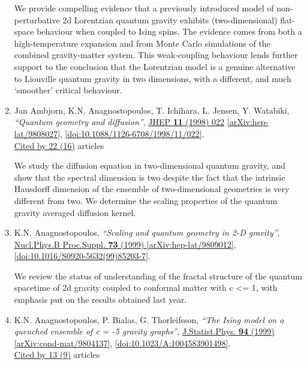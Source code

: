 \documentclass[a4paper,10pt]{article}
\begin{document}
\begin{enumerate}
We provide compelling evidence that a previously introduced model of non-perturbative 2d Lorentzian quantum gravity exhibits (two-dimensional) flat-space behaviour when coupled to Ising spins. The evidence comes from both a high-temperature expansion and from Monte Carlo simulations of the combined gravity-matter system. This weak-coupling behaviour lends further support to the conclusion that the Lorentzian model is a genuine alternative to Liouville quantum gravity in two dimensions, with a different, and much `smoother' critical behaviour.
\item Jan Ambjorn, K.N. Anagnostopoulos, T. Ichihara, L. Jensen, Y. Watabiki, {\it ``Quantum geometry and diffusion''}, \href{https://www.doi.org/10.1088/1126-6708/1998/11/022}{JHEP {\bf 11} (1998) 022} \href{https://arxiv.org/abs/hep-lat/9808027}{[arXiv:hep-lat/9808027]}, \href{https://www.doi.org/10.1088/1126-6708/1998/11/022}{[doi:10.1088/1126-6708/1998/11/022]}.
\\\href{https://inspirehep.net/literature/?q=refersto%3Arecid%3A475119}{Cited by 22 (16)} articles

We study the diffusion equation in two-dimensional quantum gravity, and show that the spectral dimension is two despite the fact that the intrinsic Hausdorff dimension of the ensemble of two-dimensional geometries is very different from two. We determine the scaling properties of the quantum gravity averaged diffusion kernel.
\item K.N. Anagnostopoulos, {\it ``Scaling and quantum geometry in 2-D gravity''}, \href{https://www.doi.org/10.1016/S0920-5632(99)85203-7}{Nucl.Phys.B Proc.Suppl. {\bf 73} (1999) } \href{https://arxiv.org/abs/hep-lat/9809012}{[arXiv:hep-lat/9809012]}, \href{https://www.doi.org/10.1016/S0920-5632(99)85203-7}{[doi:10.1016/S0920-5632(99)85203-7]}.

We review the status of understanding of the fractal structure of the quantum spacetime of 2d gravity coupled to conformal matter with c <= 1, with emphasis put on the results obtained last year.
\item K.N. Anagnostopoulos, P. Bialas, G. Thorleifsson, {\it ``The Ising model on a quenched ensemble of c = -5 gravity graphs''}, \href{https://www.doi.org/10.1023/A:1004583901498}{J.Statist.Phys. {\bf 94} (1999) } \href{https://arxiv.org/abs/cond-mat/9804137}{[arXiv:cond-mat/9804137]}, \href{https://www.doi.org/10.1023/A:1004583901498}{[doi:10.1023/A:1004583901498]}.
\\\href{https://inspirehep.net/literature/?q=refersto%3Arecid%3A470032}{Cited by 13 (9)} articles


\end{enumerate}
\end{document}
